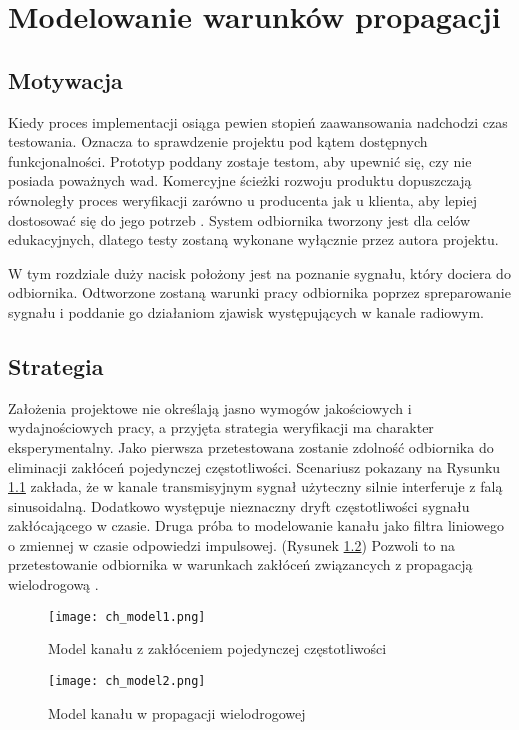 \chapter{Modelowanie warunków propagacji}
\section{Motywacja}
Kiedy proces implementacji osiąga pewien stopień zaawansowania nadchodzi czas testowania. 
Oznacza to sprawdzenie projektu pod kątem dostępnych funkcjonalności. 
Prototyp poddany zostaje testom, aby upewnić się, czy nie posiada poważnych wad. 
Komercyjne ścieżki rozwoju produktu dopuszczają równoległy proces weryfikacji zarówno u producenta jak u klienta, aby lepiej dostosować się do jego potrzeb \cite{product_dev}. 
System odbiornika tworzony jest dla celów edukacyjnych, dlatego testy zostaną wykonane wyłącznie przez autora projektu. 

W tym rozdziale duży nacisk położony jest na poznanie sygnału, który dociera do odbiornika. 
Odtworzone zostaną warunki pracy odbiornika poprzez spreparowanie sygnału i poddanie go działaniom zjawisk występujących w kanale radiowym. 
\section{Strategia}
Założenia projektowe nie określają jasno wymogów jakościowych i wydajnościowych pracy, a przyjęta strategia weryfikacji ma charakter eksperymentalny. 
Jako pierwsza przetestowana zostanie zdolność odbiornika do eliminacji zakłóceń pojedynczej częstotliwości. 
Scenariusz pokazany na Rysunku \ref{cwmodel} zakłada, że w kanale transmisyjnym sygnał użyteczny silnie interferuje z falą sinusoidalną. 
Dodatkowo występuje nieznaczny dryft częstotliwości sygnału zakłócającego w czasie.
Druga próba to modelowanie kanału jako filtra liniowego o zmiennej w czasie odpowiedzi impulsowej. (Rysunek \ref{mpathmodel})
Pozwoli to na przetestowanie odbiornika w warunkach zakłóceń związancych z propagacją wielodrogową \cite{indoor_ch_model}.

\begin{figure}[ht]
\centering
\texttt{[image: ch\_model1.png]}
\caption{Model kanału z zakłóceniem pojedynczej częstotliwości}
\label{cwmodel}
\end{figure}

\begin{figure}[ht]
\centering
\texttt{[image: ch\_model2.png]}
\caption{Model kanału w propagacji wielodrogowej}
\label{mpathmodel}
\end{figure}
